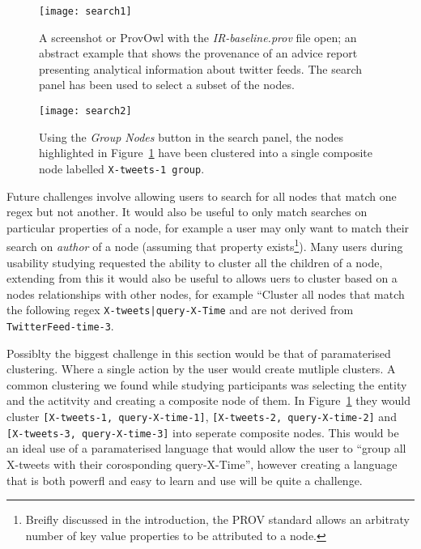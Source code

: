 \begin{figure}[h]
	\centering
	\texttt{[image: search1]}
	\caption{A screenshot or ProvOwl with the \textit{IR-baseline.prov} file open; an abstract example that shows the provenance of an advice report presenting analytical information about twitter feeds. The search panel has been used to select a subset of the nodes.}
	\label{fig:search1}
\end{figure}

\begin{figure}[h]
	\centering
	\texttt{[image: search2]}
	\caption{Using the \textit{Group Nodes} button in the search panel, the nodes highlighted in Figure~\ref{fig:search1} have been clustered into a single composite node labelled \texttt{X-tweets-1 group}.}
	\label{fig:search2}
\end{figure}

\clearpage

Future challenges involve allowing users to search for all nodes that match one regex but not another. It would also be useful to only match searches on particular properties of a node, for example a user may only want to match their search on \textit{author} of a node (assuming that property exists\footnote{Breifly discussed in the introduction, the PROV standard allows an arbitraty number of key value properties to be attributed to a node.}). Many users during usability studying requested the ability to cluster all the children of a node, extending from this it would also be useful to allows uers to cluster based on a nodes relationships with other nodes, for example ``Cluster all nodes that match the following regex \texttt{X-tweets|query-X-Time} and are not derived from \texttt{TwitterFeed-time-3}.

Possiblty the biggest challenge in this section would be that of paramaterised clustering. Where a single action by the user would create mutliple clusters. A common clustering we found while studying participants was selecting the entity and the actitvity and creating a composite node of them. In Figure~\ref{fig:search1} they would cluster \texttt{[X-tweets-1, query-X-time-1]}, \texttt{[X-tweets-2, query-X-time-2]} and \texttt{[X-tweets-3, query-X-time-3]} into seperate composite nodes. This would be an ideal use of a paramaterised language that would allow the user to ``group all X-tweets with their corosponding query-X-Time'', however creating a language that is both powerfl and easy to learn and use will be quite a challenge.

